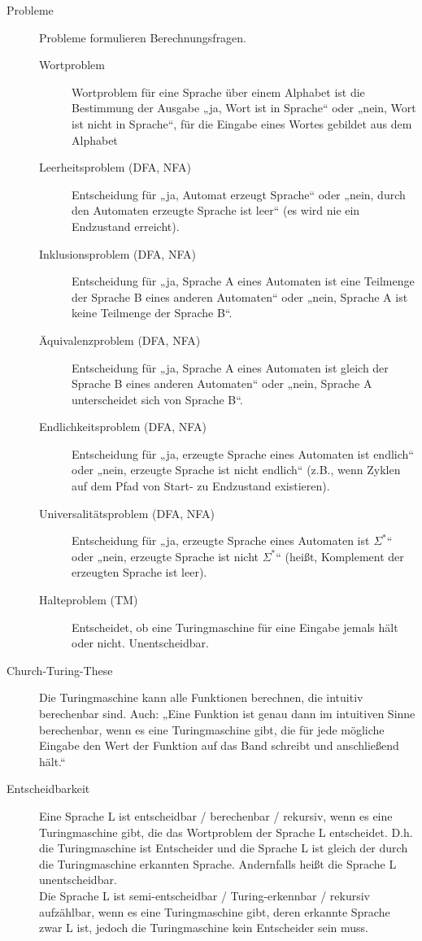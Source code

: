 \begin{description}
    \item[Probleme] Probleme formulieren Berechnungsfragen.
        \begin{description}
            \item[Wortproblem] Wortproblem für eine Sprache über einem Alphabet ist die Bestimmung der Ausgabe „ja, Wort ist in Sprache“ oder „nein, Wort ist nicht in Sprache“, für die Eingabe eines Wortes gebildet aus dem Alphabet 
            \item[Leerheitsproblem (DFA, NFA)] Entscheidung für „ja, Automat erzeugt Sprache“ oder „nein, durch den Automaten erzeugte Sprache ist leer“ (es wird nie ein Endzustand erreicht). 
            \item[Inklusionsproblem (DFA, NFA)] Entscheidung für „ja, Sprache A eines Automaten ist eine Teilmenge der Sprache B eines anderen Automaten“ oder „nein, Sprache A ist keine Teilmenge der Sprache B“. 
            \item[Äquivalenzproblem (DFA, NFA)] Entscheidung für „ja, Sprache A eines Automaten ist gleich der Sprache B eines anderen Automaten“ oder „nein, Sprache A unterscheidet sich von Sprache B“. 
            \item[Endlichkeitsproblem (DFA, NFA)] Entscheidung für „ja, erzeugte Sprache eines Automaten ist endlich“ oder „nein, erzeugte Sprache ist nicht endlich“ (z.B., wenn Zyklen auf dem Pfad von Start- zu Endzustand existieren). 
            \item[Universalitätsproblem (DFA, NFA)] Entscheidung für „ja, erzeugte Sprache eines Automaten ist $\Sigma^*$“ oder „nein, erzeugte Sprache ist nicht $\Sigma^*$“ (heißt, Komplement der erzeugten Sprache ist leer). 
            \item[Halteproblem (TM)] Entscheidet, ob eine Turingmaschine für eine Eingabe jemals hält oder nicht. Unentscheidbar. 
        \end{description}

    \item[Church-Turing-These]
        Die Turingmaschine kann alle Funktionen berechnen, die intuitiv berechenbar sind. Auch: „Eine Funktion ist genau dann
        im intuitiven Sinne berechenbar, wenn es eine Turingmaschine gibt, die für jede mögliche Eingabe den Wert der Funktion auf
        das Band schreibt und anschließend hält.“ 

    \item[Entscheidbarkeit]
        Eine Sprache L ist entscheidbar / berechenbar / rekursiv, wenn es eine Turingmaschine gibt, die das Wortproblem der Sprache L entscheidet.
        D.h. die Turingmaschine ist Entscheider und die Sprache L ist gleich der durch die Turingmaschine erkannten Sprache.
        Andernfalls heißt die Sprache L unentscheidbar. \\
        Die Sprache L ist semi-entscheidbar / Turing-erkennbar / rekursiv aufzählbar, wenn es eine Turingmaschine gibt, deren erkannte Sprache zwar L ist, jedoch die Turingmaschine kein Entscheider sein muss. 


\end{description}
